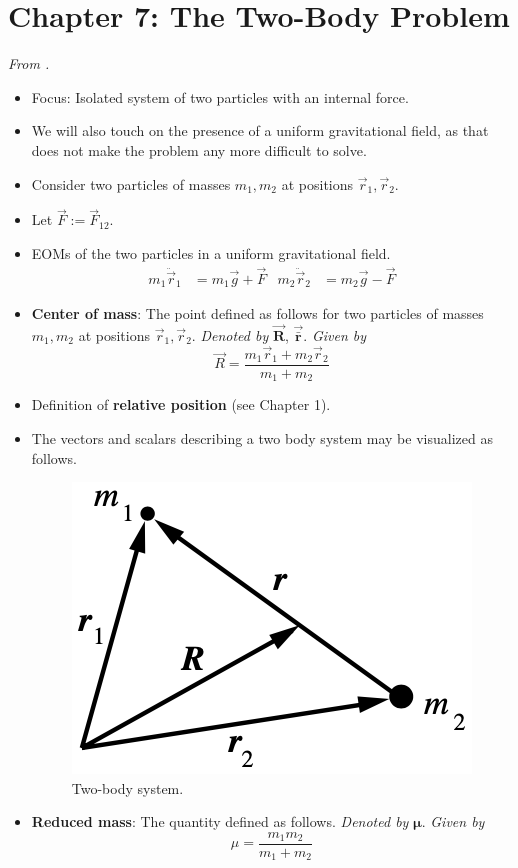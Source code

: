 \documentclass[../notes.tex]{subfiles}
\begin{document}
\section{Chapter 7: The Two-Body Problem}
\emph{From \textcite{bib:KibbleBerkshire}.}
\begin{itemize}
    \item {}Focus: Isolated system of two particles with an internal force.
    \item We will also touch on the presence of a uniform gravitational field, as that does not make the problem any more difficult to solve.
    \item Consider two particles of masses $m_1,m_2$ at positions $\vec{r}_1,\vec{r}_2$.
    \item Let $\vec{F}:=\vec{F}_{12}$.
    \item EOMs of the two particles in a uniform gravitational field.
    \begin{align*}
        m_1\ddot{\vec{r}}_1 &= m_1\vec{g}+\vec{F}&
        m_2\ddot{\vec{r}}_2 &= m_2\vec{g}-\vec{F}
    \end{align*}
    \item \textbf{Center of mass}: The point defined as follows for two particles of masses $m_1,m_2$ at positions $\vec{r}_1,\vec{r}_2$. \emph{Denoted by} $\bm{\vec{R}}$, $\bm{\vec{\bar{r}}}$. \emph{Given by}
    \begin{equation*}
        \vec{R} = \frac{m_1\vec{r}_1+m_2\vec{r}_2}{m_1+m_2}
    \end{equation*}
    \item Definition of \textbf{relative position} (see Chapter 1).
    \item The vectors and scalars describing a two body system may be visualized as follows.
    \begin{figure}[h!]
        \centering
        \includegraphics[width=0.2\linewidth]{../ExtFiles/2BodySystem.png}
        \caption{Two-body system.}
        \label{fig:2BodySystem}
    \end{figure}
    \item \textbf{Reduced mass}: The quantity defined as follows. \emph{Denoted by} $\bm{\mu}$. \emph{Given by}
    \begin{equation*}
        \mu = \frac{m_1m_2}{m_1+m_2}

\end{equation*}
\end{itemize}
\end{document}
